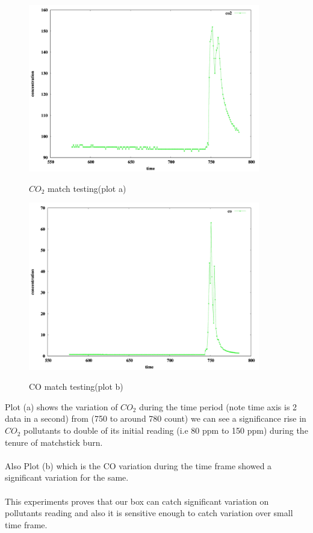 \begin{figure}
\centering
\includegraphics[width=0.9\textwidth]{./co2_match1}\\[0.1in]
\label{fig:$CO_2$ match testing}
\caption{$CO_2$ match testing(plot a)}
\end{figure}
\begin{figure}
\centering
\includegraphics[width=0.9\textwidth]{./co_match1}\\[0.1in]
\label{CO match testing}
\caption{CO match testing(plot b)}
\end{figure}

Plot (a) shows the variation of $CO_2$ during the time period (note time axis is 2 data in a second) from (750 to around 780 count) we can see a significance rise in $CO_2$ pollutants to double of its initial reading (i.e 80 ppm to 150 ppm) during the tenure of matchstick burn.
\\
\\
Also Plot (b) which is the CO variation during the time frame showed a significant variation for the same.
\\
\\
This experiments proves that our box can catch significant variation on pollutants reading and also it is sensitive enough to catch variation over small time frame.

